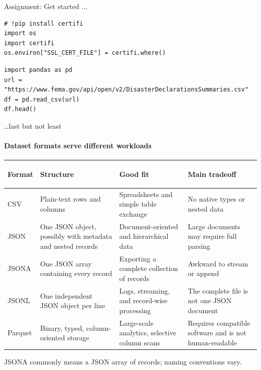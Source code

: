 \documentclass[11pt,aspectratio=43]{beamer}
\begin{document}
{  \begin{frame}[fragile]{Assignment: Get started ...}
    \small

    \begin{lstlisting}
# !pip install certifi
import os
import certifi
os.environ["SSL_CERT_FILE"] = certifi.where()
    \end{lstlisting}

    \begin{lstlisting}
import pandas as pd
url = "https://www.fema.gov/api/open/v2/DisasterDeclarationsSummaries.csv"
df = pd.read_csv(url)
df.head()
    \end{lstlisting}

  \end{frame}
}

{

  \begin{frame}{\ldots last but not least}
    \framesubtitle{Dataset formats serve different workloads}

    \footnotesize
    \renewcommand{\arraystretch}{1.05}

    \begin{tabularx}{\textwidth}{@{}>{\bfseries\raggedright\arraybackslash}p{} Y Y Y@{}}
      \toprule
      Format & Structure & Good fit & Main tradeoff \\
      \midrule
      CSV
      & Plain-text rows and columns
      & Spreadsheets and simple table exchange
      & No native types or nested data \\ \hline
      JSON
      & One JSON object, possibly with metadata and nested records
      & Document-oriented and hierarchical data
      & Large documents may require full parsing \\ \hline
      JSONA
      & One JSON array containing every record
      & Exporting a complete collection of records
      & Awkward to stream or append \\ \hline
      JSONL
      & One independent JSON object per line
      & Logs, streaming, and record-wise processing
      & The complete file is not one JSON document \\ \hline
      Parquet
      & Binary, typed, column-oriented storage
      & Large-scale analytics, selective column scans
      & Requires compatible software and is not human-readable \\
      \bottomrule
    \end{tabularx}

    \vfill
    {\tiny\color{aggiemaroon}
    JSONA commonly means a JSON array of records; naming conventions vary.\par}
  \end{frame}

}
\end{document}
